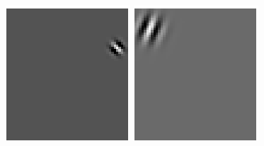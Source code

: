 \begin{figure}[ht]
\begin{center}
\includegraphics[width=\textwidth/9]{ch4/figures/Gabor5.png}
\includegraphics[width=\textwidth/9]{ch4/figures/Gabor6.png}

\end{center}
\end{figure}
